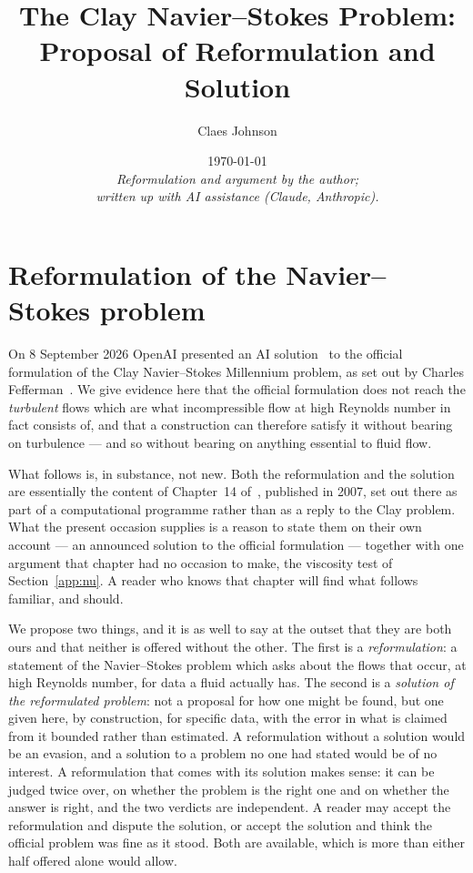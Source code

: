 \documentclass[11pt]{article}
\title{The Clay Navier--Stokes Problem:\\[0.25em]
\large Proposal of Reformulation and Solution}
\author[1]{Claes Johnson}
\affil[1]{KTH Royal Institute of Technology, SE-100 44 Stockholm, Sweden}
\date{\today \\[0.4em]
\small\textit{Reformulation and argument by the author;} \\
\small\textit{written up with AI assistance (Claude, Anthropic).}}
\begin{document}
\maketitle

\section{Reformulation of the Navier--Stokes problem}\label{sec:possform}

On 8 September 2026 OpenAI presented an AI solution~\cite{openai} to the official formulation of the
Clay Navier--Stokes Millennium problem, as set out by Charles Fefferman~\cite{fefferman}. We give evidence here
that the official formulation does not reach the
\emph{turbulent} flows which are what incompressible flow at high Reynolds number in fact consists
of, and that a construction can therefore satisfy it without bearing on turbulence --- and so
without bearing on anything essential to fluid flow.

What follows is, in substance, not new. Both the
reformulation and the solution are essentially the content of Chapter~14 of~\cite{cfd}, published in
2007, set out there as part of a computational programme rather than as a reply to the Clay problem. What the present
occasion supplies is a reason to state them on their own account --- an announced solution to the
official formulation --- together with one argument that chapter had no occasion to make, the
viscosity test of Section~\ref{app:nu}. A reader who knows that chapter will find what follows
familiar, and should.

We propose two things, and it is as well to say at the outset that they are both ours and that
neither is offered without the other. The first is a \emph{reformulation}: a statement of the
Navier--Stokes problem which asks about the flows that occur, at high Reynolds number, for data a
fluid actually has. The second is a \emph{solution of the reformulated problem}: not a proposal for
how one might be found, but one given here, by construction, for specific data, with the error in
what is claimed from it bounded rather than estimated. A reformulation without a solution would be an
evasion, and a solution to a problem no one had stated would be of no interest. A reformulation that
comes with its solution makes sense: it can be judged twice over, on whether the problem is the right
one and on whether the answer is right, and the two verdicts are independent. A reader may accept the
reformulation and dispute the solution, or accept the solution and think the official problem was fine
as it stood. Both are available, which is more than either half offered alone would allow.
\end{document}
